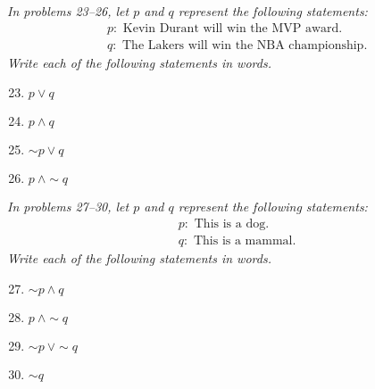 \emph{In problems 23--26, let $p$ and $q$ represent the following statements:}
\begin{align*}
&p: \textrm{ Kevin Durant will win the MVP award.}\\
&q: \textrm{ The Lakers will win the NBA championship.}
\end{align*}
\emph{Write each of the following statements in words.}
\begin{enumerate}
\setcounter{enumi}{22}

\item $p \vee q$ 

\item $p \wedge q$ 

\item $\sim p \vee q$ 

\item $p\ \wedge \sim q$ 
\end{enumerate}

\emph{In problems 27--30, let $p$ and $q$ represent the following statements:}
\begin{align*}
&p: \textrm{ This is a dog.}\\
&q: \textrm{ This is a mammal.}
\end{align*}
\emph{Write each of the following statements in words.}
\begin{enumerate}
\setcounter{enumi}{26}

\item $\sim p \wedge q$ 

\item $p\ \wedge \sim q$ 

\item $\sim p\ \vee \sim q$ 

\item $\sim q$ 
\end{enumerate}

